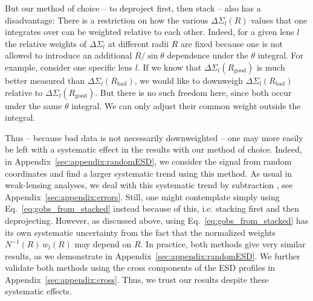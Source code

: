 \documentclass[a4paper,11pt]{article}
\begin{document}
But our method of choice -- to deproject first, then stack -- also has a disadvantage:
There is a restriction on how the various $\Delta \Sigma_l(R)$ values that one integrates over can be weighted relative to each other.
Indeed, for a given lens $l$ the relative weights of $\Delta \Sigma_l$ at different radii $R$ are fixed because one is not allowed to introduce an additional $R/\sin \theta$ dependence under the $\theta$ integral.
For example, consider one specific lens $l$.
If we know that $\Delta \Sigma_l(R_{\mathrm{good}})$ is much better measured than $\Delta \Sigma_l(R_{\mathrm{bad}})$, we would like to downweigh $\Delta \Sigma_l(R_{\mathrm{bad}})$ relative to $\Delta \Sigma_l(R_{\mathrm{good}})$.
But there is no such freedom here, since both occur under the same $\theta$ integral.
We can only adjust their common weight outside the integral.

Thus -- because bad data is not necessarily downweighted -- one may more easily be left with a systematic effect in the results with our method of choice.
Indeed, in Appendix~\ref{sec:appendix:randomESD}, we consider the signal from random coordinates and find a larger systematic trend using this method.
As usual in weak-lensing analyses, we deal with this systematic trend by subtraction \citep{Brouwer2021}, see Appendix~\ref{sec:appendix:errors}.
Still, one might contemplate simply using Eq.~\eqref{eq:gobs_from_stacked} instead because of this, i.e. stacking first and then deprojecting.
However, as discussed above, using Eq.~\eqref{eq:gobs_from_stacked} has its own systematic uncertainty from the fact that the normalized weights $N^{-1}(R) \, w_l(R)$ may depend on $R$.
In practice, both methods give very similar results, as we demonstrate in Appendix~\ref{sec:appendix:randomESD}.
We further validate both methods using the cross components of the ESD profiles in Appendix~\ref{sec:appendix:cross}.
Thus, we trust our results despite these systematic effects.
\end{document}
